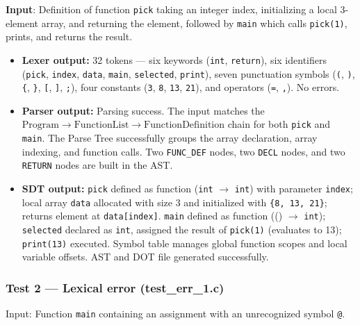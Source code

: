 \documentclass[letterpaper,12pt,oneside]{article}
\begin{document}
\textbf{Input}: Definition of function \texttt{pick} taking an integer index, initializing a local 3-element array, and returning the element, followed by \texttt{main} which calls \texttt{pick(1)}, prints, and returns the result.

\begin{itemize}
    \item \textbf{Lexer output:} 32 tokens --- six keywords (\texttt{int}, \texttt{return}), six identifiers (\texttt{pick}, \texttt{index}, \texttt{data}, \texttt{main}, \texttt{selected}, \texttt{print}), seven punctuation symbols (\texttt{(}, \texttt{)}, \texttt{\{}, \texttt{\}}, \texttt{[}, \texttt{]}, \texttt{;}), four constants (\texttt{3}, \texttt{8}, \texttt{13}, \texttt{21}), and operators (\texttt{=}, \texttt{,}). No errors.
    \item \textbf{Parser output:} Parsing success. The input matches the $\text{Program} \rightarrow \text{FunctionList} \rightarrow \text{FunctionDefinition}$ chain for both \texttt{pick} and \texttt{main}. The Parse Tree successfully groups the array declaration, array indexing, and function calls. Two \texttt{FUNC\_DEF} nodes, two \texttt{DECL} nodes, and two \texttt{RETURN} nodes are built in the AST.
    \item \textbf{SDT output:} \texttt{pick} defined as function (\texttt{int} $\rightarrow$ \texttt{int}) with parameter \texttt{index}; local array \texttt{data} allocated with size 3 and initialized with \texttt{\{8, 13, 21\}}; returns element at \texttt{data[index]}. \texttt{main} defined as function (() $\rightarrow$ \texttt{int}); \texttt{selected} declared as \texttt{int}, assigned the result of \texttt{pick(1)} (evaluates to 13); \texttt{print(13)} executed. Symbol table manages global function scopes and local variable offsets. AST and DOT file generated successfully.
\end{itemize}


\subsubsection{Test 2 --- Lexical error (test\_err\_1.c)}

Input: Function \texttt{main} containing an assignment with an unrecognized symbol \texttt{@}.
\end{document}
